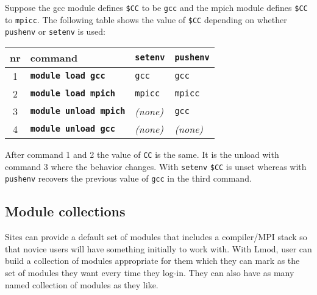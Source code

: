 Suppose the gcc module defines \texttt{\$CC} to be \texttt{gcc} and the mpich module
defines \texttt{\$CC} to \texttt{mpicc}.  The following table shows the value of
\texttt{\$CC} depending on whether \texttt{pushenv} or \texttt{setenv} is used:
\begin{center}
 \begin{tabular}{c|l|l|l}
 nr & command                                 & \texttt{setenv} & \texttt{pushenv}\\
 \hline
 1 & \textbf{\texttt{module load   gcc}}   & \texttt{gcc}    & \texttt{gcc}  \\
 2 & \textbf{\texttt{module load   mpich}} & \texttt{mpicc}  & \texttt{mpicc} \\
 3 & \textbf{\texttt{module unload mpich}} & \emph{(none)}   & \texttt{gcc}  \\
 4 & \textbf{\texttt{module unload gcc}}   & \emph{(none)}   & \emph{(none)} \\
  \hline
    \end{tabular}
\end{center}
\noindent
After command 1 and 2 the value of \texttt{CC} is the same.  It is the unload
with command 3 where the behavior changes.  With \texttt{setenv} \texttt{\$CC} is unset
whereas with \texttt{pushenv} recovers the previous value of
\texttt{gcc} in the third command.


\subsection{Module collections}

Sites can provide a default set of modules that includes a
compiler/MPI stack so that novice users will have something initially
to work with.  With Lmod, user can build a collection of modules
appropriate for them which they can mark as the set of modules they
want every time they log-in.  They can also have as many named
collection of modules as they like.




